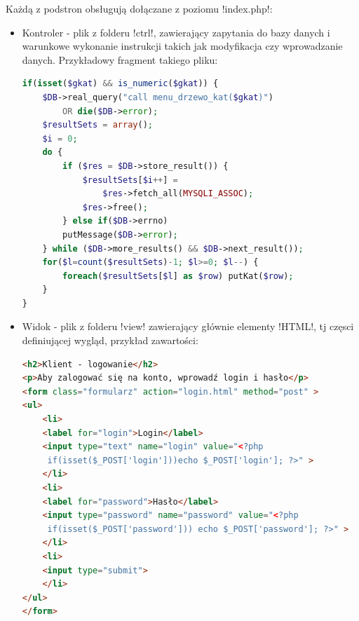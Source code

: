 Każdą z podstron obsługują dołączane z poziomu \s!index.php!:
\begin{itemize}
	\item Kontroler - plik z folderu \s!ctrl!, zawierający zapytania do bazy danych i warunkowe wykonanie instrukcji takich jak modyfikacja czy wprowadzanie danych. Przykładowy fragment takiego pliku:
\begin{lstlisting}[language=PHP]
if(isset($gkat) && is_numeric($gkat)) {
	$DB->real_query("call menu_drzewo_kat($gkat)") 
		OR die($DB->error);
	$resultSets = array();
	$i = 0;
	do {
		if ($res = $DB->store_result()) {
			$resultSets[$i++] = 
				$res->fetch_all(MYSQLI_ASSOC);
			$res->free();
		} else if($DB->errno)
		putMessage($DB->error);
	} while ($DB->more_results() && $DB->next_result());
	for($l=count($resultSets)-1; $l>=0; $l--) {
		foreach($resultSets[$l] as $row) putKat($row);
	}
}
\end{lstlisting}
	\item Widok - plik z folderu \s!view! zawierający głównie elementy \s!HTML!, tj częsci definiującej wygląd, przykład zawartości:
\begin{lstlisting}[language=HTML,showstringspaces=false]
<h2>Klient - logowanie</h2>
<p>Aby zalogować się na konto, wprowadź login i hasło</p>
<form class="formularz" action="login.html" method="post" >
<ul>
	<li>
	<label for="login">Login</label>
	<input type="text" name="login" value="<?php
	 if(isset($_POST['login']))echo $_POST['login']; ?>" >
	</li>
	<li>
	<label for="password">Hasło</label>
	<input type="password" name="password" value="<?php
	 if(isset($_POST['password'])) echo $_POST['password']; ?>" >
	</li>
	<li>
	<input type="submit">
	</li>
</ul>
</form>
\end{lstlisting}
\end{itemize}

